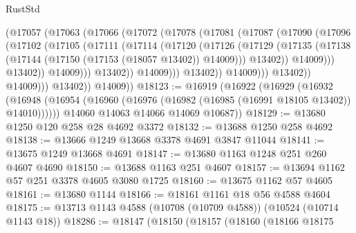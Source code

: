 \begin{lexlean}{RustStd}
\begin{coremodule}
                            (@17057
                              (@17063
                                (@17066
                                  (@17072
                                    (@17078
                                      (@17081
                                        (@17087
                                          (@17090
                                            (@17096
                                              (@17102
                                                (@17105
                                                  (@17111
                                                    (@17114
                                                      (@17120
                                                        (@17126
                                                          (@17129
                                                            (@17135
                                                              (@17138
                                                                (@17144
                                                                  (@17150
                                                                    (@17153 (@18057 @13402))
                                                                    @14009)))
                                                              @13402))
                                                          @14009)))
                                                    @13402))
                                                @14009)))
                                          @13402))
                                      @14009)))
                                @13402))
                            @14009)))
                      @13402))
                  @14009)))
            @13402))
        @14009))
@18123 := @16919
    (@16922
      (@16929
        (@16932 (@16948 (@16954 (@16960 (@16976 (@16982 (@16985 (@16991 @18105 @13402)) @14010))))))
        @14060
        @14063
        @14066
        @14069
        @10687))
@18129 := @13680 @1250 @120 @258 @28 @4692 @3372
@18132 := @13688 @1250 @258 @4692
@18138 := @13666 @1249 @13668 @3378 @4691 @3847 @11044
@18141 := @13675 @1249 @13668 @4691
@18147 := @13680 @1163 @1248 @251 @260 @4607 @4690
@18150 := @13688 @1163 @251 @4607
@18157 := @13694 @1162 @57 @251 @3378 @4605 @3080 @1725
@18160 := @13675 @1162 @57 @4605
@18161 := @13680 @1144
@18166 := @18161 @1161 @18 @56 @4588 @4604
@18175 := @13713 @1143 @4588 (@10708 (@10709 @4588)) (@10524 (@10714 @1143 @18))
@18286 := @18147
    (@18150
      (@18157
        (@18160
          (@18166
            @18175

\end{coremodule}
\end{lexlean}

